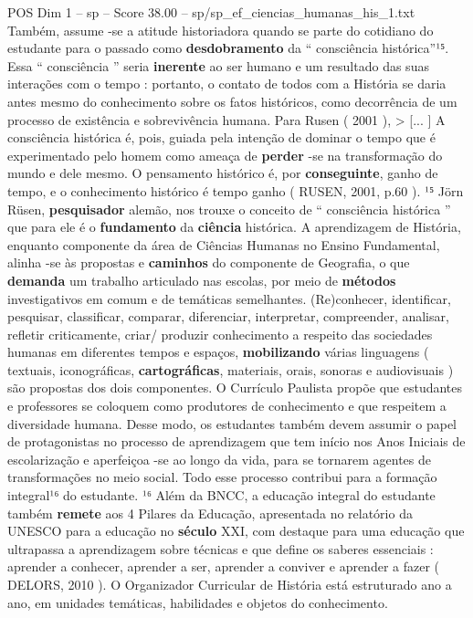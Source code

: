 \begin{textsample}{POS Dim 1 – sp – Score 38.00 – sp/sp\_ef\_ciencias\_humanas\_his\_1.txt}
Também, assume -se a atitude historiadora quando se parte do cotidiano do estudante para o passado como \textbf{desdobramento} da “ consciência histórica”¹⁵.
Essa “ consciência ” seria \textbf{inerente} ao ser humano e um resultado das suas interações com o tempo : portanto, o contato de todos com a História se daria antes mesmo do conhecimento sobre os fatos históricos, como decorrência de um processo de existência e sobrevivência humana.
Para Rusen ( 2001 ), > [... ] A consciência histórica é, pois, guiada pela intenção de dominar o tempo que é experimentado pelo homem como ameaça de \textbf{perder} -se na transformação do mundo e dele mesmo.
O pensamento histórico é, por \textbf{conseguinte}, ganho de tempo, e o conhecimento histórico é tempo ganho ( RUSEN, 2001, p.60 ). ¹⁵ Jörn Rüsen, \textbf{pesquisador} alemão, nos trouxe o conceito de “ consciência histórica ” que para ele é o \textbf{fundamento} da \textbf{ciência} histórica.
A aprendizagem de História, enquanto componente da área de Ciências Humanas no Ensino Fundamental, alinha -se às propostas e \textbf{caminhos} do componente de Geografia, o que \textbf{demanda} um trabalho articulado nas escolas, por meio de \textbf{métodos} investigativos em comum e de temáticas semelhantes. (Re)conhecer, identificar, pesquisar, classificar, comparar, diferenciar, interpretar, compreender, analisar, refletir criticamente, criar/ produzir conhecimento a respeito das sociedades humanas em diferentes tempos e espaços, \textbf{mobilizando} várias linguagens ( textuais, iconográficas, \textbf{cartográficas}, materiais, orais, sonoras e audiovisuais ) são propostas dos dois componentes.
O Currículo Paulista propõe que estudantes e professores se coloquem como produtores de conhecimento e que respeitem a diversidade humana.
Desse modo, os estudantes também devem assumir o papel de protagonistas no processo de aprendizagem que tem início nos Anos Iniciais de escolarização e aperfeiçoa -se ao longo da vida, para se tornarem agentes de transformações no meio social.
Todo esse processo contribui para a formação integral¹⁶ do estudante. ¹⁶ Além da BNCC, a educação integral do estudante também \textbf{remete} aos 4 Pilares da Educação, apresentada no relatório da UNESCO para a educação no \textbf{século} XXI, com destaque para uma educação que ultrapassa a aprendizagem sobre técnicas e que define os saberes essenciais : aprender a conhecer, aprender a ser, aprender a conviver e aprender a fazer ( DELORS, 2010 ).
O Organizador Curricular de História está estruturado ano a ano, em unidades temáticas, habilidades e objetos do conhecimento.

\end{textsample}
